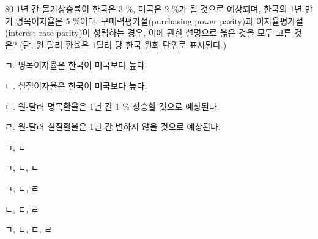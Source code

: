 \begin{question}{80}
1년 간 물가상승률이 한국은 3 \%, 미국은 2 \%가 될 것으로 예상되며, 한국의 1년 만기 명목이자율은 5 \%이다. 구매력평가설(purchasing power parity)과 이자율평가설(interest rate parity)이 성립하는 경우, 이에 관한 설명으로 옳은 것을 모두 고른 것은? (단, 원-달러 환율은 1달러 당 한국 원화 단위로 표시된다.)
\begin{framedtext}
ㄱ. 명목이자율은 한국이 미국보다 높다. \par
ㄴ. 실질이자율은 한국이 미국보다 높다. \par
ㄷ. 원-달러 명목환율은 1년 간 1 \% 상승할 것으로 예상된다. \par
ㄹ. 원-달러 실질환율은 1년 간 변하지 않을 것으로 예상된다. \par
\end{framedtext}
\begin{choices}
  \item ㄱ, ㄴ
  \item ㄱ, ㄴ, ㄷ
  \item ㄱ, ㄷ, ㄹ
  \item ㄴ, ㄷ, ㄹ
  \item ㄱ, ㄴ, ㄷ, ㄹ
\end{choices}
\end{question}
